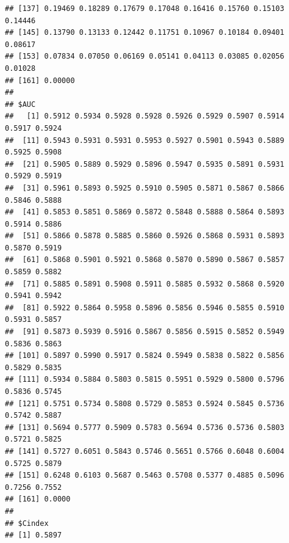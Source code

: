 \documentclass{article}\usepackage[]{graphicx}\usepackage[]{color}
\makeatletter
\newenvironment{kframe}{%
 \def\at@end@of@kframe{}%
 \ifinner\ifhmode%
  \def\at@end@of@kframe{\end{minipage}}%
  \begin{minipage}{\columnwidth}%
 \fi\fi%
 \def\FrameCommand##1{\hskip\@totalleftmargin \hskip-\fboxsep
 \colorbox{shadecolor}{##1}\hskip-\fboxsep
     \hskip-\linewidth \hskip-\@totalleftmargin \hskip\columnwidth}%
 \MakeFramed {\advance\hsize-\width
   \@totalleftmargin\z@ \linewidth\hsize
   \@setminipage}}%
 {\par\unskip\endMakeFramed%
 \at@end@of@kframe}
\newenvironment{knitrout}{}{} %
\makeatother
\begin{document}
\begin{knitrout}
\begin{kframe}
\begin{verbatim}
## [137] 0.19469 0.18289 0.17679 0.17048 0.16416 0.15760 0.15103 0.14446
## [145] 0.13790 0.13133 0.12442 0.11751 0.10967 0.10184 0.09401 0.08617
## [153] 0.07834 0.07050 0.06169 0.05141 0.04113 0.03085 0.02056 0.01028
## [161] 0.00000
## 
## $AUC
##   [1] 0.5912 0.5934 0.5928 0.5928 0.5926 0.5929 0.5907 0.5914 0.5917 0.5924
##  [11] 0.5943 0.5931 0.5931 0.5953 0.5927 0.5901 0.5943 0.5889 0.5925 0.5908
##  [21] 0.5905 0.5889 0.5929 0.5896 0.5947 0.5935 0.5891 0.5931 0.5929 0.5919
##  [31] 0.5961 0.5893 0.5925 0.5910 0.5905 0.5871 0.5867 0.5866 0.5846 0.5888
##  [41] 0.5853 0.5851 0.5869 0.5872 0.5848 0.5888 0.5864 0.5893 0.5914 0.5886
##  [51] 0.5866 0.5878 0.5885 0.5860 0.5926 0.5868 0.5931 0.5893 0.5870 0.5919
##  [61] 0.5868 0.5901 0.5921 0.5868 0.5870 0.5890 0.5867 0.5857 0.5859 0.5882
##  [71] 0.5885 0.5891 0.5908 0.5911 0.5885 0.5932 0.5868 0.5920 0.5941 0.5942
##  [81] 0.5922 0.5864 0.5958 0.5896 0.5856 0.5946 0.5855 0.5910 0.5931 0.5857
##  [91] 0.5873 0.5939 0.5916 0.5867 0.5856 0.5915 0.5852 0.5949 0.5836 0.5863
## [101] 0.5897 0.5990 0.5917 0.5824 0.5949 0.5838 0.5822 0.5856 0.5829 0.5835
## [111] 0.5934 0.5884 0.5803 0.5815 0.5951 0.5929 0.5800 0.5796 0.5836 0.5745
## [121] 0.5751 0.5734 0.5808 0.5729 0.5853 0.5924 0.5845 0.5736 0.5742 0.5887
## [131] 0.5694 0.5777 0.5909 0.5783 0.5694 0.5736 0.5736 0.5803 0.5721 0.5825
## [141] 0.5727 0.6051 0.5843 0.5746 0.5651 0.5766 0.6048 0.6004 0.5725 0.5879
## [151] 0.6248 0.6103 0.5687 0.5463 0.5708 0.5377 0.4885 0.5096 0.7256 0.7552
## [161] 0.0000
## 
## $Cindex
## [1] 0.5897
\end{verbatim}
\end{kframe}
\end{knitrout}
\end{document}
